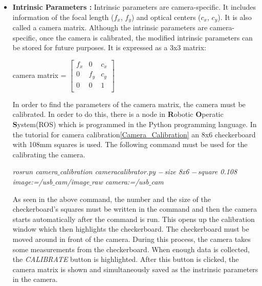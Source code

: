 \begin{itemize}

\item \textbf{Intrinsic Parameters :} Intrinsic parameters are camera-specific. It includes
information of the focal length ($f_x$, $f_y$) and optical centers ($c_x$, $c_y$). It is also called a camera matrix. Although the intrinsic parameters are camera-specific, once the camera is calibrated, the modified intrinsic parameters can be stored for future purposes. It is expressed as a 3x3 matrix:

 \begin{center}
  camera matrix =  $
 \begin{bmatrix} 
f_x & 0 & c_x \\
0 & f_y & c_y \\
0 & 0 & 1 \\
\end{bmatrix}
$  \end{center}


In order to find the parameters of the camera matrix, the camera must be calibrated. In order to do this, there is a node in \textbf{R}obotic \textbf{O}peratic \textbf{S}ystem(ROS) which is programmed in the Python programming language. In the tutorial for camera calibration\ref{Camera_Calibration} an 8x6 checkerboard with 108mm squares is used. The following command must be used for the calibrating the camera. 

\textit{ rosrun camera$ \_ $calibration cameracalibrator.py $ \-- $size 8x6 $ \-- $square 0.108 image:=/usb$ \_ $cam/image$ \_ $raw camera:=/usb$ \_ $cam}

As seen in the above command, the number and the size of the checkerboard's squares must be written in the command and then the camera starts automatically after the command is run. This opens up the calibration window which then highlights the checkerboard. The checkerboard must be moved around in front of the camera. During this process, the camera takes some measurements from the checkerboard. When enough data is collected, the \textit{CALIBRATE} button is highlighted. After this button is clicked, the camera matrix is shown and simultaneously saved as the instrinsic parameters in the camera.



\end{itemize}
